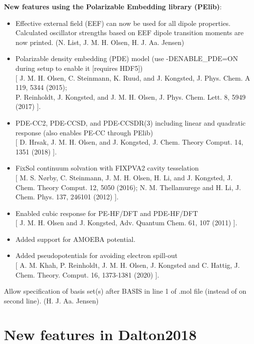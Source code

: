 \begin{description}
\item{\bf New features using the Polarizable Embedding library (PElib)}:
   \begin{itemize}
  \item Effective external field (EEF) can now be used for all dipole properties. Calculated oscillator strengths based on EEF dipole transition moments are now printed. (N. List, J. M. H. Olsen, H. J. Aa. Jensen)
  \item Polarizable density embedding (PDE) model (use -DENABLE\_PDE=ON during setup to enable it [requires HDF5]) \\ {}
    [ J. M. H. Olsen, C. Steinmann, K. Ruud, and J. Kongsted, J. Phys. Chem. A 119, 5344 (2015); \\
      P. Reinholdt, J. Kongsted, and J. M. H. Olsen, J. Phys. Chem. Lett. 8, 5949 (2017) ].
  \item PDE-CC2, PDE-CCSD, and PDE-CCSDR(3) including linear and quadratic response (also enables PE-CC through PElib) \\ {}
    [ D. Hrsak, J. M. H. Olsen, and J. Kongsted, J. Chem. Theory Comput. 14, 1351 (2018) ].
  \item FixSol continuum solvation with FIXPVA2 cavity tesselation \\ {}
    [ M. S. Nørby, C. Steinmann, J. M. H. Olsen, H. Li, and J. Kongsted, J. Chem. Theory Comput. 12, 5050 (2016);
      N. M. Thellamurege and H. Li, J. Chem. Phys. 137, 246101 (2012) ].
  \item Enabled cubic response for PE-HF/DFT and PDE-HF/DFT \\ {}
    [ J. M. H. Olsen and J. Kongsted, Adv. Quantum Chem. 61, 107 (2011) ].
  \item Added support for AMOEBA potential.
  \item Added pseudopotentials for avoiding electron spill-out \\ {}
    [ A. M. Khah, P. Reinholdt, J. M. H. Olsen, J. Kongsted and C. Hattig, J. Chem. Theory. Comput. 16, 1373-1381 (2020) ].
   \end{itemize}
  \item  Allow specification of basis set(s) after BASIS in line 1 of .mol file (instead of on second line). (H. J. Aa. Jensen)
\end{description}

\section{New features in Dalton2018}

